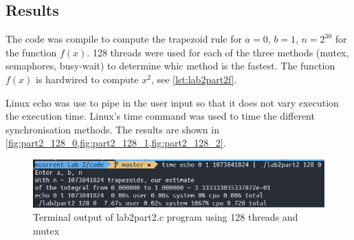 \vspace{0.5cm}


\subsection{Results}

The code was compile to compute the trapezoid rule for $a=0$, $b=1$, $n=2^{30}$ for the function $f(x)$.
128 threads were used for each of the three methods (mutex, semaphores, busy-wait) to determine whic method is the fastest.
The function $f(x)$ is hardwired to compute $x^2$, see \cref{lst:lab2part2f}.

\vspace{0.5cm}


Linux echo was use to pipe in the user input so that it does not vary execution the execution time. Linux's
time command was used to time the different synchronisation methods. The results are shown in 
\cref{fig:part2_128_0,fig:part2_128_1,fig:part2_128_2}.

\begin{figure}[ht]
	\centering
	\includegraphics[width=\textwidth]{Figures/part2_128_1.PNG}
	\caption{Terminal output of lab2part2.c program using 128 threads and mutex}
	\label{fig:part2_128_0}
\end{figure}

